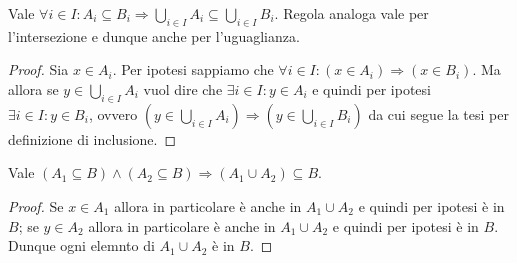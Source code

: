 \begin{lemma}
  Vale $ \forall i \in I : A_i \subseteq B_i \Rightarrow \bigcup_{i \in I} A_i \subseteq \bigcup_{i \in I} B_i $. Regola analoga vale per l'intersezione e dunque anche per l'uguaglianza.
\end{lemma}
\begin{proof}
  Sia $ x \in A_i $. Per ipotesi sappiamo che $ \forall i \in I: (x \in A_i) \Rightarrow (x \in B_i) $. Ma allora se $ y \in \bigcup_{i \in I} A_i $ vuol dire che $ \exists i \in I : y \in A_i $ e quindi per ipotesi $ \exists i \in I : y \in B_i $, ovvero $ (y \in \bigcup_{i \in I} A_i) \Rightarrow (y \in \bigcup_{i \in I} B_i)  $ da cui segue la tesi per definizione di inclusione.
\end{proof}

\begin{lemma}
  Vale $ 	(A_1 \subseteq B) \wedge (A_2 \subseteq B) \Rightarrow (A_1 \cup A_2) \subseteq B $.
\end{lemma}
\begin{proof}
  Se $ x \in A_1 $ allora in particolare è anche in $ A_1 \cup A_2 $ e quindi per ipotesi è in $ B $; se $ y \in A_2 $ allora in particolare è anche in $ A_1 \cup A_2 $ e quindi per ipotesi è in $ B $. Dunque ogni elemnto di $ A_1 \cup A_2 $ è in $ B $.
\end{proof}

